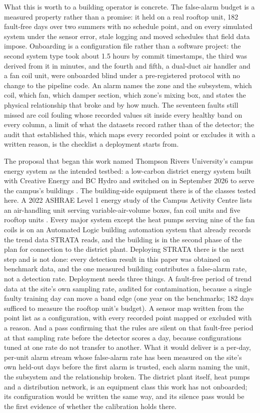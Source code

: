 \documentclass[11pt,letterpaper]{article}
\begin{document}
What this is worth to a building operator is concrete. The false-alarm budget is a measured property rather than a promise: it held on a real rooftop unit, 182 fault-free days over two summers with no schedule point, and on every simulated system under the sensor error, stale logging and moved schedules that field data impose. Onboarding is a configuration file rather than a software project: the second system type took about 1.5 hours by commit timestamps, the third was derived from it in minutes, and the fourth and fifth, a dual-duct air handler and a fan coil unit, were onboarded blind under a pre-registered protocol with no change to the pipeline code. An alarm names the zone and the subsystem, which coil, which fan, which damper section, which zone's mixing box, and states the physical relationship that broke and by how much. The seventeen faults still missed are coil fouling whose recorded values sit inside every healthy band on every column, a limit of what the datasets record rather than of the detector; the audit that established this, which maps every recorded point or excludes it with a written reason, is the checklist a deployment starts from.

The proposal that began this work named Thompson Rivers University's campus energy system as the intended testbed: a low-carbon district energy system built with Creative Energy and BC Hydro and switched on in September 2026 to serve the campus's buildings \cite{tru2026lcdes,tru2025lcdesmilestone}. The building-side equipment there is of the classes tested here. A 2022 ASHRAE Level 1 energy study of the Campus Activity Centre lists an air-handling unit serving variable-air-volume boxes, fan coil units and five rooftop units \cite{ses2022cacstudy}. Every major system except the heat pumps serving nine of the fan coils is on an Automated Logic building automation system that already records the trend data STRATA reads, and the building is in the second phase of the plan for connection to the district plant. Deploying STRATA there is the next step and is not done: every detection result in this paper was obtained on benchmark data, and the one measured building contributes a false-alarm rate, not a detection rate. Deployment needs three things. A fault-free period of trend data at the site's own sampling rate, audited for contamination, because a single faulty training day can move a band edge (one year on the benchmarks; 182 days sufficed to measure the rooftop unit's budget). A sensor map written from the point list as a configuration, with every recorded point mapped or excluded with a reason. And a pass confirming that the rules are silent on that fault-free period at that sampling rate before the detector scores a day, because configurations tuned at one rate do not transfer to another. What it would deliver is a per-day, per-unit alarm stream whose false-alarm rate has been measured on the site's own held-out days before the first alarm is trusted, each alarm naming the unit, the subsystem and the relationship broken. The district plant itself, heat pumps and a distribution network, is an equipment class this work has not onboarded; its configuration would be written the same way, and its silence pass would be the first evidence of whether the calibration holds there.
\end{document}
